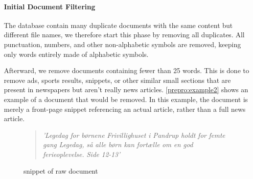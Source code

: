 \paragraph{Initial Document Filtering}
The database contain many duplicate documents with the same content but different file names, we therefore start this phase by removing all duplicates.
All punctuation, numbers, and other non-alphabetic symbols are removed, keeping only words entirely made of alphabetic symbols.

Afterward, we remove documents containing fewer than 25 words.
This is done to remove ads, sports results, snippets, or other similar small sections that are present in newspapers but aren't really news articles.
\autoref{prepro:example2} shows an example of a document that would be removed. In this example, the document is merely a front-page snippet referencing an actual article, rather than a full news article.
\begin{figure}[h]
	\begin{quote}
		\textit{
			'Legedag for børnene Frivillighuset i Pandrup holdt for femte gang Legedag, så alle børn kan fortælle om en god ferieoplevelse. Side 12-13'
		}
	\end{quote}
	\caption{snippet of raw document}
	\label{prepro:example2}
\end{figure}


